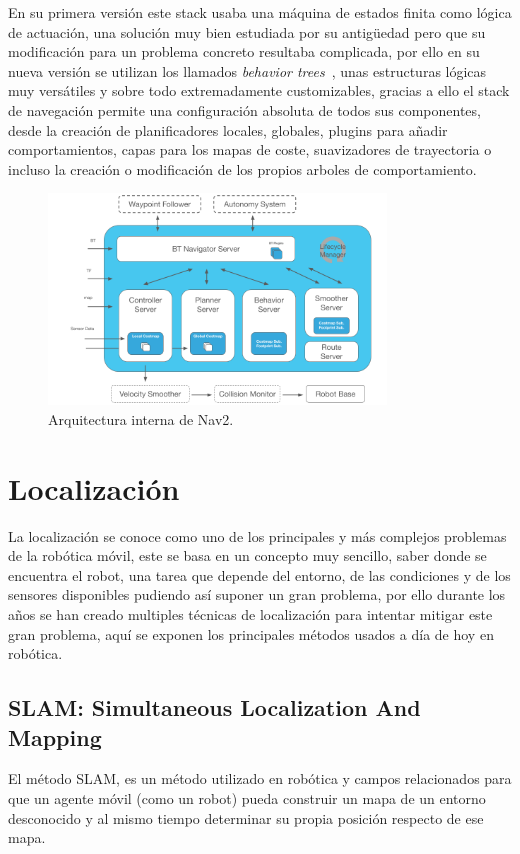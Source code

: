 En su primera versión este stack usaba una máquina de estados finita como lógica de actuación, una solución muy bien estudiada por su antigüedad
pero que su modificación para un problema concreto resultaba complicada, por ello en su nueva versión se utilizan los llamados 
\textit{behavior trees}~\cite{colledanchise2018behavior}, unas estructuras lógicas muy versátiles y sobre todo extremadamente customizables, 
gracias a ello el stack de navegación permite una configuración absoluta de todos sus componentes, desde la creación de planificadores locales, globales, 
plugins para añadir comportamientos, capas para los mapas de coste, suavizadores de trayectoria o incluso la creación o modificación de los 
propios arboles de comportamiento.
\begin{figure}[h]
    \centering
    \includegraphics[width=0.8\textwidth]{images/nav2_architecture.png}
    \caption{Arquitectura interna de Nav2.}
    \label{fig:nav2_arch}
\end{figure}
\newpage
\section{Localización}
La localización se conoce como uno de los principales y más complejos problemas de la robótica móvil, este se basa en un concepto 
muy sencillo, saber donde se encuentra el robot, una tarea que depende del entorno, de las condiciones y de los sensores disponibles 
pudiendo así suponer un gran problema, por ello durante los años se han creado multiples técnicas de localización para intentar mitigar este 
gran problema, aquí se exponen los principales métodos usados a día de hoy en robótica.

\subsection{SLAM: Simultaneous Localization And Mapping}
El método SLAM, es un método utilizado en robótica y campos relacionados para que un agente móvil (como un robot) pueda construir un mapa de un 
entorno desconocido y al mismo tiempo determinar su propia posición respecto de ese mapa.

